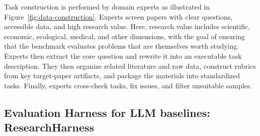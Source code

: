 Task construction is performed by domain experts as illustrated in Figure~\ref{fig:data-construction}. Experts screen papers with clear questions, accessible data, and high research value. Here, research value includes scientific, economic, ecological, medical, and other dimensions, with the goal of ensuring that the benchmark evaluates problems that are themselves worth studying. Experts then extract the core question and rewrite it into an executable task description. They then organize related literature and raw data, construct rubrics from key target-paper artifacts, and package the materials into standardized tasks. Finally, experts cross-check tasks, fix issues, and filter unsuitable samples.




\subsection{Evaluation Harness for LLM baselines: ResearchHarness}


